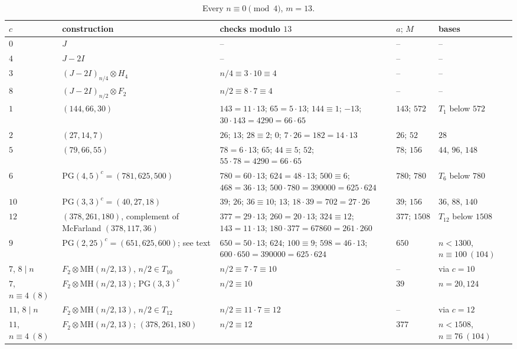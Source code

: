 \documentclass[10pt]{article}
\theoremstyle{remark}
\newcommand{\MH}{\mathrm{MH}}
\newcommand{\PG}{\mathrm{PG}}
\begin{document}
\begin{table}[t]
\footnotesize
\setlength{\tabcolsep}{4pt}
\renewcommand{\arraystretch}{1.15}
\caption{Every $n\equiv0\pmod 4$, $m=13$.}\label{tab:13}
\begin{tabular}{@{}>{\raggedright}p{1.6cm}>{\raggedright}p{3.6cm}>{\raggedright}p{6.1cm}>{\raggedright}p{1.45cm}>{\raggedright\arraybackslash}p{2.75cm}@{}}
$c$ & construction & checks modulo $13$ & $a;\,M$ & bases\\ \hline
$0$ & $J$ & -- & -- & --\\
$4$ & $J-2I$ & -- & -- & --\\
$3$ & $(J-2I)_{n/4}\otimes H_4$ & $n/4\equiv3\cdot10\equiv4$ & -- & --\\
$8$ & $(J-2I)_{n/2}\otimes F_2$ & $n/2\equiv8\cdot7\equiv4$ & -- & --\\
$1$ & $(144,66,30)$ & $143=11\cdot13$; $65=5\cdot13$; $144\equiv1$; $-13$; $30\cdot143=4290=66\cdot65$ & $143;\,572$ & $T_1$ below $572$\\
$2$ & $(27,14,7)$ & $26$; $13$; $28\equiv2$; $0$; $7\cdot26=182=14\cdot13$ & $26;\,52$ & $28$\\
$5$ & $(79,66,55)$ & $78=6\cdot13$; $65$; $44\equiv5$; $52$; $55\cdot78=4290=66\cdot65$ & $78;\,156$ & $44$, $96$, $148$\\
$6$ & $\PG(4,5)^c=(781,625,500)$ & $780=60\cdot13$; $624=48\cdot13$; $500\equiv6$; $468=36\cdot13$; $500\cdot780=390000=625\cdot624$ & $780;\,780$ & $T_6$ below $780$\\
$10$ & $\PG(3,3)^c=(40,27,18)$ & $39$; $26$; $36\equiv10$; $13$; $18\cdot39=702=27\cdot26$ & $39;\,156$ & $36$, $88$, $140$\\
$12$ & $(378,261,180)$, complement of McFarland $(378,117,36)$ & $377=29\cdot13$; $260=20\cdot13$; $324\equiv12$; $143=11\cdot13$; $180\cdot377=67860=261\cdot260$ & $377;\,1508$ & $T_{12}$ below $1508$\\
$9$ & $\PG(2,25)^c=(651,625,600)$; see text & $650=50\cdot13$; $624$; $100\equiv9$; $598=46\cdot13$; $600\cdot650=390000=625\cdot624$ & $650$ & $n<1300$, $n\equiv100\ (104)$\\
$7$, $8\mid n$ & $F_2\otimes\MH(n/2,13)$, $n/2\in T_{10}$ & $n/2\equiv7\cdot7\equiv10$ & -- & via $c=10$\\
$7$, $n\equiv4\ (8)$ & $F_2\otimes\MH(n/2,13)$; $\PG(3,3)^c$ & $n/2\equiv10$ & $39$ & $n=20,124$\\
$11$, $8\mid n$ & $F_2\otimes\MH(n/2,13)$, $n/2\in T_{12}$ & $n/2\equiv11\cdot7\equiv12$ & -- & via $c=12$\\
$11$, $n\equiv4\ (8)$ & $F_2\otimes\MH(n/2,13)$; $(378,261,180)$ & $n/2\equiv12$ & $377$ & $n<1508$, $n\equiv76\ (104)$\\
\end{tabular}
\end{table}
\end{document}
